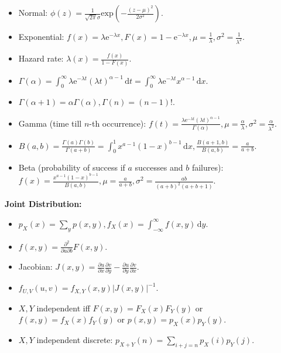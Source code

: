 \documentclass[9pt]{article}
\begin{document}
\begin{multicols*}{2}
\begin{itemize}
            \item Normal: $\phi(z) = \frac{1}{\sqrt{2\pi}\sigma}\mathrm{exp}\left(-\frac{(z - \mu)^2}{2\sigma^2}\right)$.
            \item Exponential: $f(x) = \lambda\mathrm{e}^{-\lambda x}, F(x) = 1 - \mathrm{e}^{-\lambda x}, \mu = \frac{1}{\lambda}, \sigma^2 = \frac{1}{\lambda^2}$.
            \item Hazard rate: $\lambda(x) = \frac{f(x)}{1 - F(x)}$.
            \item $\Gamma(\alpha) = \int_{0}^{\infty}\!\lambda\mathrm{e}^{-\lambda t}(\lambda t)^{\alpha - 1}\,\mathrm{d}t = \int_{0}^{\infty}\!\lambda\mathrm{e}^{-\lambda t}x^{\alpha - 1}\,\mathrm{d}x$.
            \item $\Gamma(\alpha + 1) = \alpha\Gamma(\alpha), \Gamma(n) = (n - 1)!$.
            \item Gamma (time till $n$-th occurrence): $f(t) = \frac{\lambda\mathrm{e}^{-\lambda t}(\lambda t)^{\alpha - 1}}{\Gamma(\alpha)}, \mu = \frac{\alpha}{\lambda}, \sigma^2 = \frac{\alpha}{\lambda^2}$.
            \item $B(a, b) = \frac{\Gamma(a)\Gamma(b)}{\Gamma(a + b)} = \int_{0}^{1}\!x^{a - 1}(1 - x)^{b - 1}\,\mathrm{d}x, \frac{B(a + 1, b)}{B(a, b)} = \frac{a}{a + b}$.
            \item Beta (probability of success if $a$ successes and $b$ failures): $f(x) = \frac{x^{a - 1}(1 - x)^{b - 1}}{B(a, b)}, \mu = \frac{a}{a + b}, \sigma^2 = \frac{ab}{(a + b)^2(a + b + 1)}$.
        \end{itemize}
        \textbf{Joint Distribution:}
        \begin{itemize}
            \item $p_X(x) = \sum_{y}p(x, y), f_X(x) = \int_{-\infty}^{\infty}\!f(x, y)\,\mathrm{d}y$.
            \item $f(x, y) = \frac{\partial^2}{\partial a \partial b}F(x, y)$.
            \item Jacobian: $J(x, y) = \frac{\partial u}{\partial x}\frac{\partial v}{\partial y} - \frac{\partial u}{\partial y}\frac{\partial v}{\partial x}$.
            \item $f_{U, V}(u, v) = f_{X, Y}(x, y)\left\lvert J(x, y)\right\rvert^{-1}$.
            \item $X, Y$ independent iff $F(x, y) = F_X(x)F_Y(y)$ or $f(x, y) = f_X(x)f_Y(y)$ or $p(x, y) = p_X(x)p_Y(y)$.
            \item $X, Y$ independent discrete: $p_{X + Y}(n) = \sum_{i + j = n}p_X(i)p_Y(j)$.

\end{itemize}
\end{multicols*}
\end{document}

